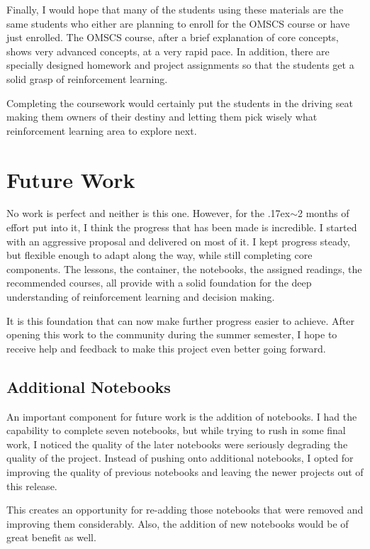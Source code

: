 \documentclass[11pt]{article} %
\begin{document}
Finally, I would hope that many of the students using these materials are
the same students who either are planning to enroll for the OMSCS course or have just
enrolled. The OMSCS course, after a brief explanation of core concepts,
shows very advanced concepts, at a very rapid pace. In addition, there are specially
designed homework and project assignments so that the students get a solid
grasp of reinforcement learning.

Completing the coursework would certainly put the students in the driving seat
making them owners of their destiny and letting them pick wisely what reinforcement
learning area to explore next. 

\section{Future Work}

No work is perfect and neither is this one. However, for the
{\raise.17ex\hbox{$\scriptstyle\sim$}}2 months of effort
put into it, I think the progress that has been made is incredible. I started
with an aggressive proposal and delivered on most of it. I kept progress steady, but
flexible enough to adapt along the way, while still completing core components.
The lessons, the container, the notebooks, the assigned readings, the recommended
courses, all provide with a solid foundation for the deep understanding of
reinforcement learning and decision making.

It is this foundation that can now make further progress easier to achieve. After
opening this work to the community during the summer semester, I hope to receive
help and feedback to make this project even better going forward.

\subsection{Additional Notebooks}

An important component for future work is the addition of notebooks. I had the capability
to complete seven notebooks, but while trying to rush in some final work, I noticed
the quality of the later notebooks were seriously degrading the quality of the
project. Instead of pushing onto additional notebooks, I opted for improving the quality
of previous notebooks and leaving the newer projects out of this release.

This creates an opportunity for re-adding those notebooks that were removed and
improving them considerably. Also, the addition of new notebooks would be of
great benefit as well.
\end{document}
